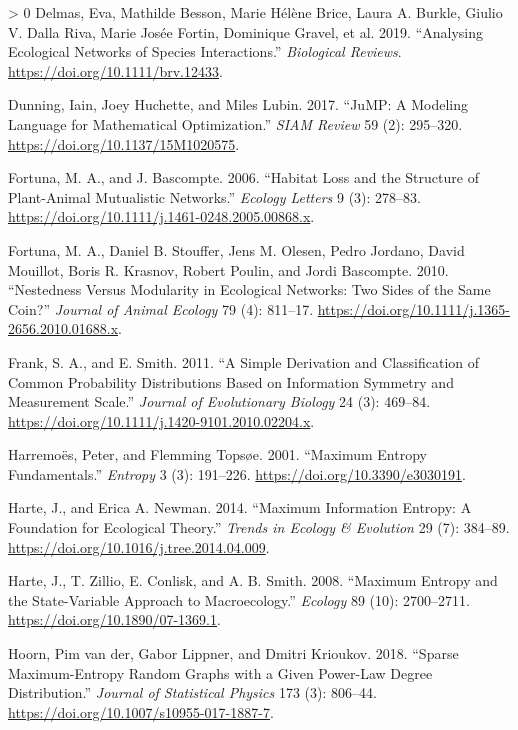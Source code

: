 \documentclass[10pt,oneside]{article}
\newlength{\cslhangindent}
\newenvironment{CSLReferences}[3] %
 {%
  \setlength{\parindent}{0pt}
  \ifodd #1 \everypar{\setlength{\hangindent}{\cslhangindent}}\ignorespaces\fi
  \ifnum #2 > 0
  \setlength{\parskip}{#2\baselineskip}
  \fi
 }%
 {}
\begin{document}
\begin{CSLReferences}{1}{0}
\leavevmode\hypertarget{ref-Delmas2019AnaEco}{}%
Delmas, Eva, Mathilde Besson, Marie Hélène Brice, Laura A. Burkle,
Giulio V. Dalla Riva, Marie Josée Fortin, Dominique Gravel, et al. 2019.
{``Analysing Ecological Networks of Species Interactions.''}
\emph{Biological Reviews}. \url{https://doi.org/10.1111/brv.12433}.

\leavevmode\hypertarget{ref-Dunning2017JumMod}{}%
Dunning, Iain, Joey Huchette, and Miles Lubin. 2017. {``JuMP: A Modeling
Language for Mathematical Optimization.''} \emph{SIAM Review} 59 (2):
295--320. \url{https://doi.org/10.1137/15M1020575}.

\leavevmode\hypertarget{ref-Fortuna2006HabLos}{}%
Fortuna, M. A., and J. Bascompte. 2006. {``Habitat Loss and the
Structure of Plant-Animal Mutualistic Networks.''} \emph{Ecology
Letters} 9 (3): 278--83.
\url{https://doi.org/10.1111/j.1461-0248.2005.00868.x}.

\leavevmode\hypertarget{ref-Fortuna2010NesMod}{}%
Fortuna, M. A., Daniel B. Stouffer, Jens M. Olesen, Pedro Jordano, David
Mouillot, Boris R. Krasnov, Robert Poulin, and Jordi Bascompte. 2010.
{``Nestedness Versus Modularity in Ecological Networks: Two Sides of the
Same Coin?''} \emph{Journal of Animal Ecology} 79 (4): 811--17.
\url{https://doi.org/10.1111/j.1365-2656.2010.01688.x}.

\leavevmode\hypertarget{ref-Frank2011SimDera}{}%
Frank, S. A., and E. Smith. 2011. {``A Simple Derivation and
Classification of Common Probability Distributions Based on Information
Symmetry and Measurement Scale.''} \emph{Journal of Evolutionary
Biology} 24 (3): 469--84.
\url{https://doi.org/10.1111/j.1420-9101.2010.02204.x}.

\leavevmode\hypertarget{ref-Harremoes2001MaxEnt}{}%
Harremoës, Peter, and Flemming Topsøe. 2001. {``Maximum Entropy
Fundamentals.''} \emph{Entropy} 3 (3): 191--226.
\url{https://doi.org/10.3390/e3030191}.

\leavevmode\hypertarget{ref-Harte2014MaxInf}{}%
Harte, J., and Erica A. Newman. 2014. {``Maximum Information Entropy: A
Foundation for Ecological Theory.''} \emph{Trends in Ecology \&
Evolution} 29 (7): 384--89.
\url{https://doi.org/10.1016/j.tree.2014.04.009}.

\leavevmode\hypertarget{ref-Harte2008MaxEnt}{}%
Harte, J., T. Zillio, E. Conlisk, and A. B. Smith. 2008. {``Maximum
Entropy and the State-Variable Approach to Macroecology.''}
\emph{Ecology} 89 (10): 2700--2711.
\url{https://doi.org/10.1890/07-1369.1}.

\leavevmode\hypertarget{ref-vanderHoorn2018SpaMaxa}{}%
Hoorn, Pim van der, Gabor Lippner, and Dmitri Krioukov. 2018. {``Sparse
Maximum-Entropy Random Graphs with a Given Power-Law Degree
Distribution.''} \emph{Journal of Statistical Physics} 173 (3): 806--44.
\url{https://doi.org/10.1007/s10955-017-1887-7}.


\end{CSLReferences}
\end{document}
